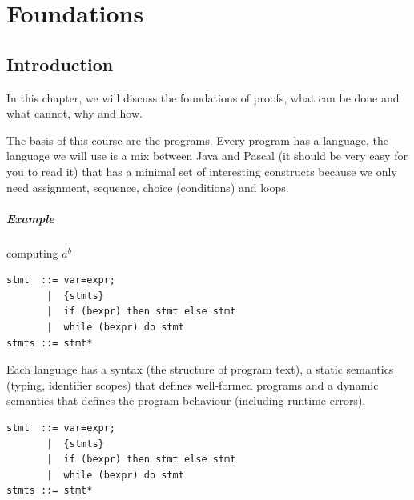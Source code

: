 \documentclass[12pt, a4paper]{book}
\begin{document}
  \chapter{Foundations}
  \label{chap:Foundations}

  \section{Introduction}
  \label{sec:Introduction}

In this chapter, we will discuss the foundations of proofs, what can be done
and what cannot, why and how. \newline

The basis of this course are the programs. Every program has a language, the
language we will use is a mix between Java and Pascal (it should be very
easy for you to read it) that has a minimal set of interesting constructs
because we only need assignment, sequence, choice (conditions) and loops.
\newline

\paragraph{Example} computing $a^b$
\begin{lstlisting}
stmt  ::= var=expr;
       |  {stmts}
       |  if (bexpr) then stmt else stmt
       |  while (bexpr) do stmt
stmts ::= stmt*
\end{lstlisting}

Each language has a syntax (the structure of program text), a static semantics
(typing, identifier scopes) that defines well-formed programs and a dynamic
semantics that defines the program behaviour (including runtime errors).
\newline

\begin{verbatim}
stmt  ::= var=expr;
       |  {stmts}
       |  if (bexpr) then stmt else stmt
       |  while (bexpr) do stmt
stmts ::= stmt*
\end{verbatim}
\end{document}
